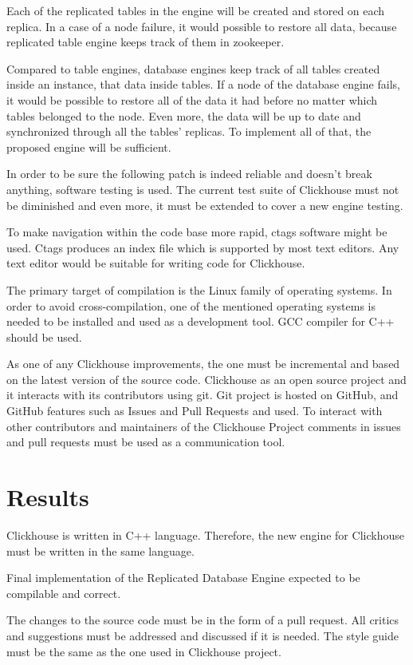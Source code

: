 \documentclass[conference]{IEEEtran}
\begin{document}
Each of the replicated tables in the engine will be created and stored on each replica.
In a case of a node failure, it would possible to restore all data, because replicated
table engine keeps track of them in zookeeper.

Compared to table engines, database engines keep track of all tables created inside an
instance, that data inside tables. If a node of the database engine fails, it would
be possible to restore all of the data it had before no matter which tables belonged
to the node. Even more, the data will be up to date and synchronized through all the tables'
replicas. To implement all of that, the proposed engine will be sufficient.

In order to be sure the following patch is indeed reliable and doesn't break anything,
software testing is used. The current test suite of Clickhouse must not be
diminished and even more, it must be extended to cover a new engine testing.

To make navigation within the code base more
rapid, ctags software might be used. Ctags produces an index file which is supported
by most text editors.
Any text editor would be suitable for writing code for Clickhouse.

The primary target of compilation is the Linux family of operating systems.
In order to avoid cross-compilation, one of the mentioned operating systems
is needed to be installed and used as a development tool. GCC compiler for C++ should be used.

As one of any Clickhouse improvements, the one must be incremental and based
on the latest version of the source code. Clickhouse as an open source project and it
interacts with its contributors using git. Git project is hosted on GitHub, and
GitHub features such as Issues and Pull Requests and used. To interact with other
contributors and maintainers of the Clickhouse Project comments in issues and
pull requests must be used as a communication tool.

\section{Results}
Clickhouse is written in C++ language. Therefore, the new engine for Clickhouse
must be written in the same language.

Final implementation of the Replicated Database Engine expected to be compilable
and correct.

The changes to the source code must be in the form of a pull request. All critics and suggestions
must be addressed and discussed if it is needed. The style guide must be the same as
the one used in Clickhouse project.
\end{document}

